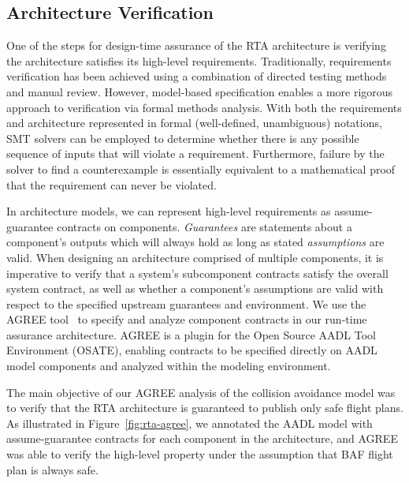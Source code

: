 \subsection{Architecture Verification}


One of the steps for design-time assurance of the RTA architecture is verifying the architecture satisfies its high-level requirements.  Traditionally, requirements verification has been achieved using a combination of directed testing methods and manual review. However, model-based specification enables a more rigorous approach to verification via formal methods analysis. With both the requirements and architecture represented in formal (well-defined, unambiguous) notations, SMT solvers can be employed to determine whether there is any possible sequence of inputs that will violate a requirement.  Furthermore, failure by the solver to find a counterexample is essentially equivalent to a mathematical proof that the requirement can never be violated.  

In architecture models, we can represent high-level requirements as assume-guarantee contracts on components.  \textit{Guarantees} are statements about a component's outputs which will always hold as long as stated \textit{assumptions} are valid.  When designing an architecture comprised of multiple components, it is imperative to verify that a system's subcomponent contracts satisfy the overall system contract, as well as whether a component's assumptions are valid with respect to the specified upstream guarantees and environment.
%
We use the AGREE tool~\cite{agree2012} to specify and analyze component contracts in our run-time assurance architecture.  AGREE is a plugin for the Open Source AADL Tool Environment (OSATE), enabling contracts to be specified directly on AADL model components and analyzed within the modeling environment.


The main objective of our AGREE analysis of the collision avoidance model was to verify that the RTA architecture is guaranteed to publish only safe flight plans.
%
As illustrated in Figure~\ref{fig:rta-agree}, we annotated the AADL model with assume-guarantee contracts for each component in the architecture, and AGREE was able to verify the high-level property under the assumption that BAF flight plan is always safe.

